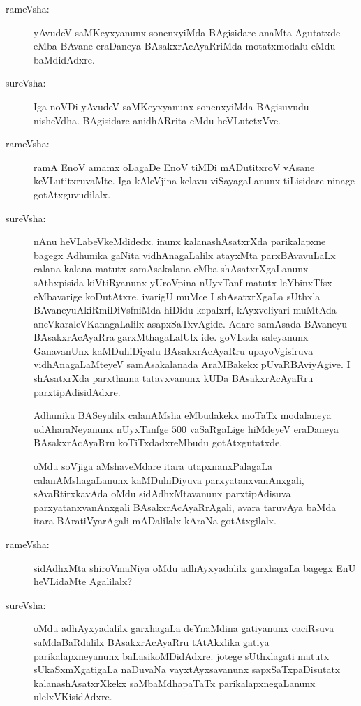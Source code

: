\begin{description}
\item[rameVsha:] yAvudeV saMKeyxyanunx sonenxyiMda BAgisidare anaMta Agutatxde eMba BAvane eraDaneya BAsakxrAcAyaRriMda motatxmodalu eMdu baMdidAdxre.

\item[sureVsha:] Iga noVDi yAvudeV saMKeyxyanunx sonenxyiMda BAgisuvudu nisheVdha. BAgisidare anidhARrita eMdu heVLutetxVve.

\item[rameVsha:] ramA EnoV amamx oLagaDe EnoV tiMDi mADutitxroV vAsane keVLutitxruvaMte. Iga kAleVjina kelavu viSayagaLanunx tiLisidare ninage gotAtxguvudilalx.

\item[sureVsha:] nAnu heVLabeVkeMdidedx. inunx kalanashAsatxrXda parikalapxne bagegx Adhunika gaNita vidhAnagaLalilx atayxMta parxBAvavuLaLx calana kalana matutx samAsakalana eMba shAsatxrXgaLanunx sAthxpisida kiVtiRyanunx yUroVpina nUyxTanf matutx leYbinxTfsx eMbavarige koDutAtxre. ivarigU muMce I shAsatxrXgaLa sUthxla BAvaneyu\break AkiRmiDiVsfniMda hiDidu kepalxrf, kAyxveliyari muMtAda aneVkara\break leVKanagaLalilx asapxSaTxvAgide. Adare samAsada BAvaneyu BAsakxrAcAyaR\-ra garxMthagaLalUlx ide. goVLada saleyanunx GanavanUnx kaMDuhiDiyalu BAsakxrAcAyaRru upayoVgisiruva vidhAnagaLaMteyeV samAsakalanada AraMBakekx pUvaRBAviyAgive. I shAsatxrXda parxthama tatavxvanunx kUDa BAsakxrAcAyaRru parxtipAdisidAdxre.

Adhunika BASeyalilx calanAMsha eMbudakekx moTaTx modalaneya udA\-haraNeyanunx nUyxTanfge $500$ vaSaRgaLige hiMdeyeV eraDaneya BAsakxrAcAyaRru koTiTxdadxreMbudu gotAtxgutatxde.

oMdu soVjiga aMshaveMdare itara utapxnanxPalagaLa calanAMshagaLanunx kaMDuhiDiyuva parxyatanxvanAnxgali, sAvaRtirxkavAda oMdu sidAdhxMtavanunx parxtipAdisuva parxyatanxvanAnxgali BAsakxrAcAyaRrAgali, avara taruvAya baMda itara BAratiVyarAgali mADalilalx kAraNa gotAtxgilalx.

\item[rameVsha:] sidAdhxMta shiroVmaNiya oMdu adhAyxyadalilx garxhagaLa bagegx EnU heVLidaMte Agalilalx?

\item[sureVsha:] oMdu adhAyxyadalilx garxhagaLa deYnaMdina gatiyanunx caciRsuva saMdaBaR\-dalilx BAsakxrAcAyaRru tAtAkxlika gatiya parikalapxneyanunx baLasikoMDidAdxre. jotege sUthxlagati matutx sUkaSxmXgatigaLa naDuvaNa vayxtAyxsavanunx sapxSaTxpaDisutatx kalanashAsatxrXkekx saMbaMdhapaTaTx parikalapxnegaLanunx ulelxVKisidAdxre.


\end{description}
